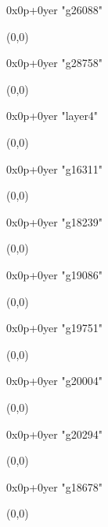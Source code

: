    0x0p+0yer "g26088"
  \begin{textblock}{1}(0,0)
  \end{textblock}

   0x0p+0yer "g28758"
  \begin{textblock}{1}(0,0)
  \end{textblock}

   0x0p+0yer "layer4"
  \begin{textblock}{1}(0,0)
  \end{textblock}

   0x0p+0yer "g16311"
  \begin{textblock}{1}(0,0)
  \end{textblock}

   0x0p+0yer "g18239"
  \begin{textblock}{1}(0,0)
  \end{textblock}

   0x0p+0yer "g19086"
  \begin{textblock}{1}(0,0)
  \end{textblock}

   0x0p+0yer "g19751"
  \begin{textblock}{1}(0,0)
  \end{textblock}

   0x0p+0yer "g20004"
  \begin{textblock}{1}(0,0)
  \end{textblock}

   0x0p+0yer "g20294"
  \begin{textblock}{1}(0,0)
  \end{textblock}

   0x0p+0yer "g18678"
  \begin{textblock}{1}(0,0)
  \end{textblock}

